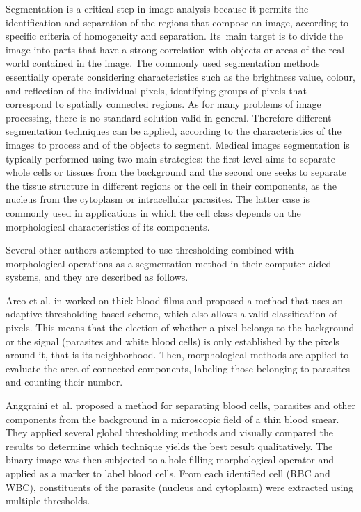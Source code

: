 \documentclass[final,a4paper,12pt,english]{UnicaPhdThesis3}
\begin{document}
Segmentation is a critical step in image analysis because it permits the identification and separation of the regions that compose an image, according to specific criteria of homogeneity and separation. Its~main target is to divide the image into parts that have a strong correlation with objects or areas of the real world contained in the image.
The commonly used segmentation methods essentially operate considering characteristics such as the brightness value, colour, and reflection of the individual pixels, identifying groups of pixels that correspond to spatially connected regions. As for many problems of image processing, there is no standard solution valid in general. Therefore different segmentation techniques can be applied, according to the characteristics of the images to process and of the objects to segment.
Medical images segmentation is typically performed using two main strategies: the first level aims to separate whole cells or tissues from the background and the second one seeks to separate the tissue structure in different regions or the cell in their components, as the nucleus from the cytoplasm or intracellular parasites. The latter case is commonly used in applications in which the cell class depends on the morphological characteristics of its components.

Several other authors attempted to use thresholding combined with morphological operations as a segmentation method in their computer-aided systems, and they are described as follows.

Arco et al. in \cite{Arco2014} worked on thick blood films and proposed a method that uses an adaptive thresholding based scheme, which also allows a valid classification of pixels. This means that the election of whether a pixel belongs to the background or the signal (parasites and white blood cells) is only established by the pixels around it, that is its neighborhood. Then, morphological methods are applied to evaluate the area of connected components, labeling those belonging to parasites and counting their number.

Anggraini et al. \cite{Anggraini2011} proposed a method for separating blood cells, parasites and other components from the background in a microscopic field of a thin blood smear. They applied several global thresholding methods and visually compared the results to determine which technique yields the best result qualitatively. The binary image was then subjected to a hole filling morphological operator and applied as a marker to label blood cells. From each identified cell (RBC and WBC), constituents of the parasite (nucleus and cytoplasm) were extracted using multiple thresholds.
\end{document}
